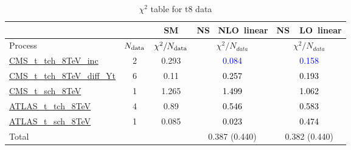 \documentclass{article}
\begin{document}
\begin{table}[H]
\centering
\begin{tabular}{|l|c|c|c|c|}
\hline
 \multicolumn{2}{|c|}{} & SM& \rm NS \ NLO\ linear& \rm NS\ \ LO\ linear\\ \hline
Process & $N_{\rm data}$ & $\chi^ 2/N_{\rm data}$& $\chi^ 2/N_{data}$& $\chi^ 2/N_{data}$\\ \hline
\href{https://arxiv.org/abs/1403.7366}{CMS_t_tch_8TeV_inc} & 2 & 0.293 & \textcolor{blue}                            {0.084} & \textcolor{blue}                            {0.158} \\ \hline
\href{https://cds.cern.ch/record/1956681}{CMS_t_tch_8TeV_diff_Yt} & 6 & 0.11 & \textcolor{black}                            {0.257} & \textcolor{black}                            {0.193} \\ \hline
\href{https://arxiv.org/abs/1603.02555}{CMS_t_sch_8TeV} & 1 & 1.265 & \textcolor{black}                            {1.499} & \textcolor{black}                            {1.062} \\ \hline
\href{https://arxiv.org/abs/1702.02859}{ATLAS_t_tch_8TeV} & 4 & 0.89 & \textcolor{black}                            {0.546} & \textcolor{black}                            {0.583} \\ \hline
\href{https://arxiv.org/abs/1511.05980}{ATLAS_t_sch_8TeV} & 1 & 0.085 & \textcolor{black}                            {0.023} & \textcolor{black}                            {0.474} \\ \hline
\hline Total & &  & 0.387 (0.440) & 0.382 (0.440) \\ \hline
\end{tabular}
\caption{$\chi^2$ table for t8 data}
\end{table}
\end{document}
